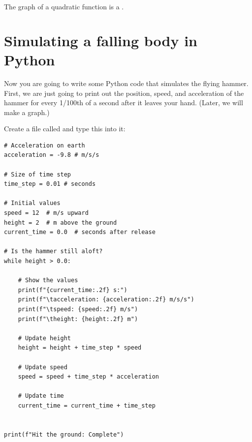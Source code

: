 \hspace{4mm}

The graph of a quadratic function is a .

\section{Simulating a falling body in Python}

Now you are going to write some Python code that simulates the flying hammer. First, we are just going to print out the position, speed, and acceleration of the hammer for every 1/100th of a second after it leaves your hand. (Later, we will make a graph.)

Create a file called  and type this into it:

\begin{Verbatim}
# Acceleration on earth
acceleration = -9.8 # m/s/s

# Size of time step
time_step = 0.01 # seconds

# Initial values
speed = 12  # m/s upward
height = 2  # m above the ground
current_time = 0.0  # seconds after release

# Is the hammer still aloft?
while height > 0.0:

    # Show the values
    print(f"{current_time:.2f} s:")
    print(f"\tacceleration: {acceleration:.2f} m/s/s")
    print(f"\tspeed: {speed:.2f} m/s")
    print(f"\theight: {height:.2f} m")

    # Update height
    height = height + time_step * speed

    # Update speed
    speed = speed + time_step * acceleration

    # Update time
    current_time = current_time + time_step


print(f"Hit the ground: Complete")
\end{Verbatim}

